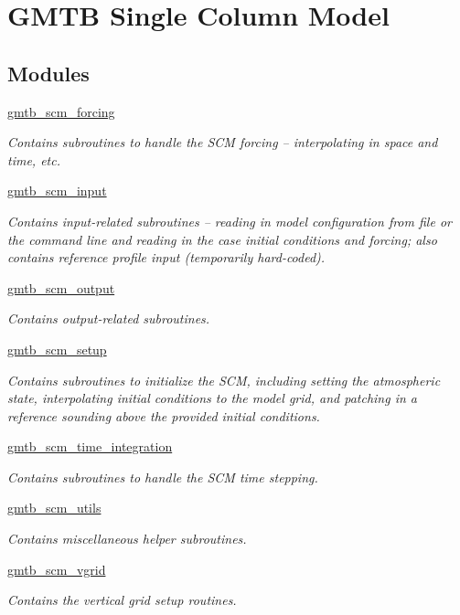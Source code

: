 \hypertarget{group___s_c_m}{}\section{G\+M\+TB Single Column Model}
\label{group___s_c_m}
\subsection*{Modules}
\begin{DoxyCompactItemize}
\item 
\hyperlink{group__forcing}{gmtb\+\_\+scm\+\_\+forcing}
\begin{DoxyCompactList}\small\item\em Contains subroutines to handle the S\+CM forcing -- interpolating in space and time, etc. \end{DoxyCompactList}\item 
\hyperlink{group__input}{gmtb\+\_\+scm\+\_\+input}
\begin{DoxyCompactList}\small\item\em Contains input-\/related subroutines -- reading in model configuration from file or the command line and reading in the case initial conditions and forcing; also contains reference profile input (temporarily hard-\/coded). \end{DoxyCompactList}\item 
\hyperlink{group__output}{gmtb\+\_\+scm\+\_\+output}
\begin{DoxyCompactList}\small\item\em Contains output-\/related subroutines. \end{DoxyCompactList}\item 
\hyperlink{group__setup}{gmtb\+\_\+scm\+\_\+setup}
\begin{DoxyCompactList}\small\item\em Contains subroutines to initialize the S\+CM, including setting the atmospheric state, interpolating initial conditions to the model grid, and patching in a reference sounding above the provided initial conditions. \end{DoxyCompactList}\item 
\hyperlink{group__time__integration}{gmtb\+\_\+scm\+\_\+time\+\_\+integration}
\begin{DoxyCompactList}\small\item\em Contains subroutines to handle the S\+CM time stepping. \end{DoxyCompactList}\item 
\hyperlink{group__utils}{gmtb\+\_\+scm\+\_\+utils}
\begin{DoxyCompactList}\small\item\em Contains miscellaneous helper subroutines. \end{DoxyCompactList}\item 
\hyperlink{group__vgrid}{gmtb\+\_\+scm\+\_\+vgrid}
\begin{DoxyCompactList}\small\item\em Contains the vertical grid setup routines. \end{DoxyCompactList}\end{DoxyCompactItemize}
